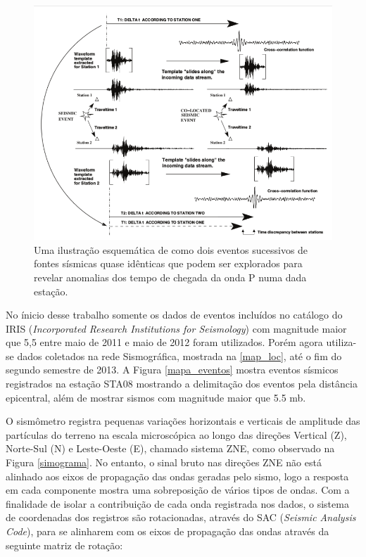 \begin{figure}[!ht]
\centering
\includegraphics[scale=0.6]{correlacao_tempo_de_chegada.png}
\caption{Uma ilustração esquemática de como dois eventos sucessivos de fontes sísmicas quase idênticas que podem ser explorados para revelar anomalias dos tempo de chegada da onda P numa dada estação. \citep{gibbons_identification_2006}}
\label{teste_tempo}
\end{figure}

No ínicio desse trabalho somente os dados de eventos incluídos no catálogo do IRIS (\textit{Incorporated Research Institutions for Seismology}) com magnitude maior que 5,5 entre maio de 2011 e maio de 2012 foram utilizados. Porém agora utiliza-se dados coletados na rede Sismográfica, mostrada na \ref{map_loc}, até o fim do segundo semestre de 2013. A Figura \ref{mapa_eventos} mostra eventos sísmicos registrados na estação STA08 mostrando a delimitação dos eventos pela distância epicentral, além de mostrar sismos com magnitude maior que 5.5 mb.

O sismômetro registra pequenas variações horizontais e verticais de amplitude das partículas do terreno na escala microscópica ao longo das direções Vertical (Z), Norte-Sul (N) e Leste-Oeste (E), chamado sistema ZNE, como observado na Figura \ref{simograma}. No entanto, o sinal bruto nas direções ZNE não está alinhado aos eixos de propagação das ondas geradas pelo sismo, logo a resposta em cada componente mostra uma sobreposição de vários tipos de ondas. Com a finalidade de isolar a contribuição de cada onda registrada nos dados, o sistema de coordenadas dos registros são rotacionadas, através do SAC (\textit{Seismic Analysis Code}), para se alinharem com os eixos de propagação das ondas através da seguinte matriz de rotação:


